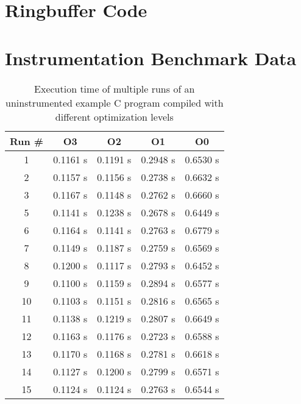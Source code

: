\clearpage

\section{Ringbuffer Code}
\label{sec:appendix:ringbuffer}



\clearpage

\section{Instrumentation Benchmark Data}
\label{sec:appendix:instrumentation_benchmark_data}

\begin{table}[]
  \caption{Execution time of multiple runs of an uninstrumented example C program compiled with different optimization levels}
  \label{table:non_instrumented_optimizations_benchmark}
  \centering
  \begin{tabular}{cllll}
    Run \# & \multicolumn{1}{c}{O3} & \multicolumn{1}{c}{O2} & \multicolumn{1}{c}{O1} & \multicolumn{1}{c}{O0} \\ \hline
    1 & 0.1161 s & 0.1191 s & 0.2948 s & 0.6530 s \\
    2 & 0.1157 s & 0.1156 s & 0.2738 s   & 0.6632 s \\
    3 & 0.1167 s & 0.1148 s & 0.2762 s & 0.6660 s \\
    5 & 0.1141 s & 0.1238 s & 0.2678 s & 0.6449 s \\
    6 & 0.1164 s & 0.1141 s & 0.2763 s & 0.6779 s \\
    7 & 0.1149 s & 0.1187 s & 0.2759 s & 0.6569 s \\
    8 & 0.1200 s & 0.1117 s & 0.2793 s & 0.6452 s \\
    9 & 0.1100 s & 0.1159 s & 0.2894 s & 0.6577 s \\
    10 &0.1103 s & 0.1151 s & 0.2816 s & 0.6565 s  \\
    11 &0.1138 s & 0.1219 s & 0.2807 s & 0.6649 s \\
    12 &0.1163 s & 0.1176 s & 0.2723 s & 0.6588 s \\
    13 &0.1170 s & 0.1168 s & 0.2781 s & 0.6618 s \\
    14 &0.1127 s & 0.1200 s & 0.2799 s & 0.6571 s \\
    15 &0.1124 s & 0.1124 s & 0.2763 s & 0.6544 s \\

\end{tabular}
\end{table}
